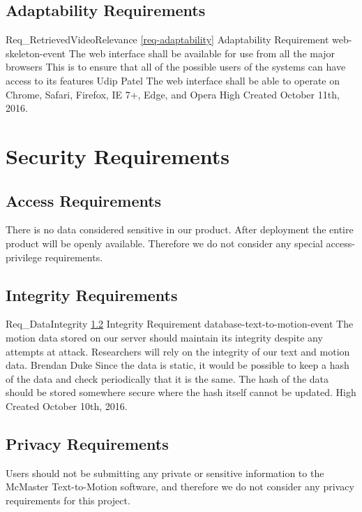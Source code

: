 \documentclass{scrreprt}
\begin{document}
\subsection{Adaptability Requirements}
\label{req-adaptablility}

\requirement
{Req_RetrievedVideoRelevance}
{\ref{req-adaptability} Adaptability Requirement}
{web-skeleton-event}
{The web interface shall be available for use from all the major browsers}
{This is to ensure that all of the possible users of the systems can have access to its features}
{Udip Patel}
{The web interface shall be able to operate on Chrome, Safari, Firefox, IE 7+, Edge, and Opera}
{High}
{Created October 11th, 2016.}


\section{Security Requirements}

\subsection{Access Requirements}

There is no data considered sensitive in our product. After deployment the
entire product will be openly available. Therefore we do not consider any
special access-privilege requirements.

\subsection{Integrity Requirements}
\label{req-integrity}

\requirement
{Req_DataIntegrity}
{\ref{req-integrity} Integrity Requirement}
{database-text-to-motion-event}
{The motion data stored on our server should maintain its integrity despite any
attempts at attack.}
{Researchers will rely on the integrity of our text and motion data.}
{Brendan Duke}
{Since the data is static, it would be possible to keep a hash of the data and
check periodically that it is the same. The hash of the data should be stored
somewhere secure where the hash itself cannot be updated.}
{High}
{Created October 10th, 2016.}

\subsection{Privacy Requirements}

Users should not be submitting any private or sensitive information to the
McMaster Text-to-Motion software, and therefore we do not consider any privacy
requirements for this project.
\end{document}
